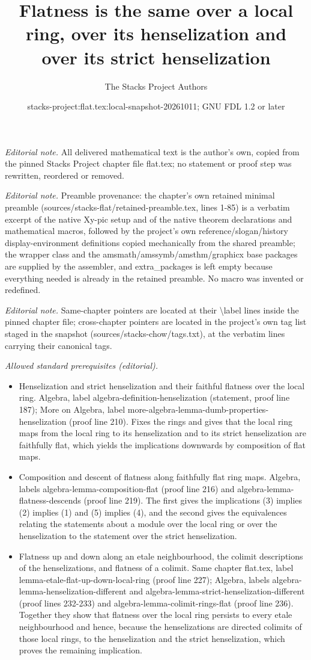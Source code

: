 \documentclass[10pt,a4paper]{amsart}
\title{Flatness is the same over a local ring, over its henselization and over its strict henselization}
\author{The Stacks Project Authors}
\date{stacks-project:flat.tex:local-snapshot-20261011; GNU FDL 1.2 or later}
\theoremstyle{plain}
\theoremstyle{definition}
\theoremstyle{remark}
\numberwithin{equation}{subsection}
\begin{document}
\maketitle
\noindent\textit{Editorial note.} All delivered mathematical text is the author's own, copied from the pinned Stacks Project chapter file flat.tex; no statement or proof step was rewritten, reordered or removed.\par\medskip
\noindent\textit{Editorial note.} Preamble provenance: the chapter's own retained minimal preamble (sources/stacks-flat/retained-preamble.tex, lines 1-85) is a verbatim excerpt of the native Xy-pic setup and of the native theorem declarations and mathematical macros, followed by the project's own reference/slogan/history display-environment definitions copied mechanically from the shared preamble; the wrapper class and the amsmath/amssymb/amsthm/graphicx base packages are supplied by the assembler, and extra\_packages is left empty because everything needed is already in the retained preamble. No macro was invented or redefined.\par\medskip
\noindent\textit{Editorial note.} Same-chapter pointers are located at their \textbackslash{}label lines inside the pinned chapter file; cross-chapter pointers are located in the project's own tag list staged in the snapshot (sources/stacks-chow/tags.txt), at the verbatim lines carrying their canonical tags.\par\medskip
\noindent\textit{Allowed standard prerequisites (editorial).}\begin{itemize}
\item Henselization and strict henselization and their faithful flatness over the local ring. Algebra, label algebra-definition-henselization (statement, proof line 187); More on Algebra, label more-algebra-lemma-dumb-properties-henselization (proof line 210). Fixes the rings and gives that the local ring maps from the local ring to its henselization and to its strict henselization are faithfully flat, which yields the implications downwards by composition of flat maps.
\item Composition and descent of flatness along faithfully flat ring maps. Algebra, labels algebra-lemma-composition-flat (proof line 216) and algebra-lemma-flatness-descends (proof line 219). The first gives the implications (3) implies (2) implies (1) and (5) implies (4), and the second gives the equivalences relating the statements about a module over the local ring or over the henselization to the statement over the strict henselization.
\item Flatness up and down along an etale neighbourhood, the colimit descriptions of the henselizations, and flatness of a colimit. Same chapter flat.tex, label lemma-etale-flat-up-down-local-ring (proof line 227); Algebra, labels algebra-lemma-henselization-different and algebra-lemma-strict-henselization-different (proof lines 232-233) and algebra-lemma-colimit-rings-flat (proof line 236). Together they show that flatness over the local ring persists to every etale neighbourhood and hence, because the henselizations are directed colimits of those local rings, to the henselization and the strict henselization, which proves the remaining implication.
\end{itemize}\medskip
\end{document}
